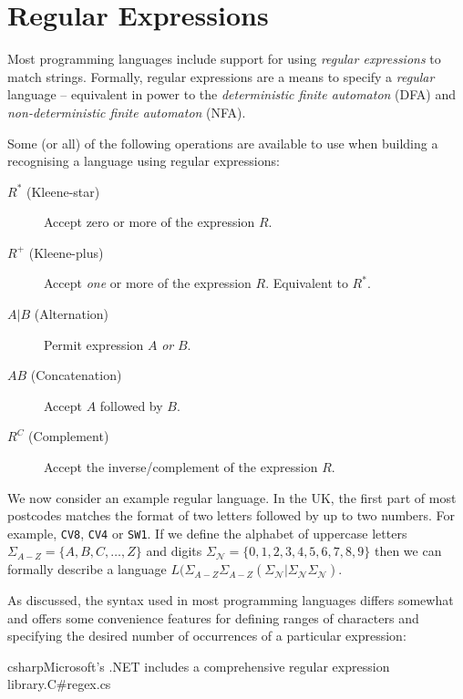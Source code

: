 \documentclass[a4paper,openany,12pt]{book}
\begin{document}
\section{Regular Expressions}
\label{regexbg}

Most programming languages include support for using \emph{regular expressions} to match strings. Formally, regular
expressions are a means to specify a \emph{regular} language -- equivalent in power to the \emph{deterministic finite
automaton} (DFA) and \emph{non-deterministic finite automaton} (NFA).

Some (or all) of the following operations are available to use when building a recognising a language using regular
expressions:

\begin{description}
    \item[$R^*$ (Kleene-star)] Accept zero or more of the expression $R$.
    \item[$R^+$ (Kleene-plus)] Accept \emph{one} or more of the expression $R$. Equivalent to ${R^*}$.
    \item[$A \vert{} B$ (Alternation)] Permit expression $A$ \emph{or} $B$.
    \item[$AB$ (Concatenation)] Accept $A$ followed by $B$.
    \item[$R^C$ (Complement)] Accept the inverse/complement of the expression $R$.
\end{description}


We now consider an example regular language. In the UK, the first part of most postcodes matches the format of two
letters followed by up to two numbers. For example, \texttt{CV8}, \texttt{CV4} or \texttt{SW1}.
If we define the alphabet of uppercase letters $\Sigma_{A-Z} = \{A, B, C, \ldots, Z\}$ and digits $\Sigma_\mathcal{N} =
\{0,1,2,3,4,5,6,7,8,9\}$ then we can formally describe a language $L(\Sigma_{A-Z} \Sigma_{A-Z}(\Sigma_\mathcal{N} |
\Sigma_\mathcal{N} \Sigma_\mathcal{N})$.

As discussed, the syntax used in most programming languages differs somewhat and offers some convenience features for
defining ranges of characters and specifying the desired number of occurrences of a particular expression:\\

\begin{mycodefile}{csharp}{Microsoft's .NET includes a comprehensive regular expression library.}{C\#}{regex.cs}
\end{mycodefile}
\end{document}
